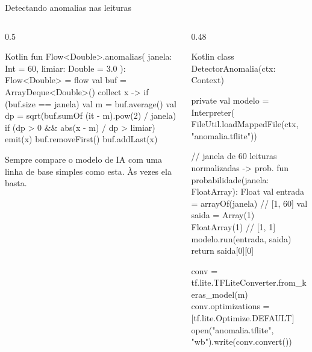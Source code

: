 \documentclass[aspectratio=169,10pt]{beamer}
\begin{document}
\begin{frame}[fragile]{Detectando anomalias nas leituras}
  \begin{columns}[T]
    \begin{column}{0.5\textwidth}
\begin{codigo}[title=1) Linha de base estatística (z-score)]{Kotlin}
fun Flow<Double>.anomalias(
  janela: Int = 60, limiar: Double = 3.0
): Flow<Double> = flow {
  val buf = ArrayDeque<Double>()
  collect { x ->
    if (buf.size == janela) {
      val m = buf.average()
      val dp = sqrt(buf.sumOf { (it - m).pow(2) } / janela)
      if (dp > 0 && abs(x - m) / dp > limiar) emit(x)
      buf.removeFirst()
    }
    buf.addLast(x)
  }
}
\end{codigo}
      \begin{dica}
        Sempre compare o modelo de IA com uma linha de base simples como esta. Às vezes ela basta.
      \end{dica}
    \end{column}
    \begin{column}{0.48\textwidth}
\begin{codigo}[title=2) Modelo próprio com LiteRT]{Kotlin}
class DetectorAnomalia(ctx: Context) {
  private val modelo = Interpreter(
    FileUtil.loadMappedFile(ctx, "anomalia.tflite"))

  // janela de 60 leituras normalizadas -> prob.
  fun probabilidade(janela: FloatArray): Float {
    val entrada = arrayOf(janela)          // [1, 60]
    val saida = Array(1) { FloatArray(1) } // [1, 1]
    modelo.run(entrada, saida)
    return saida[0][0]
  }
}
\end{codigo}
\begin{terminal}[title=Treino em Python (Keras) e conversão]
conv = tf.lite.TFLiteConverter.from_keras_model(m)
conv.optimizations = [tf.lite.Optimize.DEFAULT]
open("anomalia.tflite", "wb").write(conv.convert())
\end{terminal}
    \end{column}
  \end{columns}
\end{frame}
\end{document}
